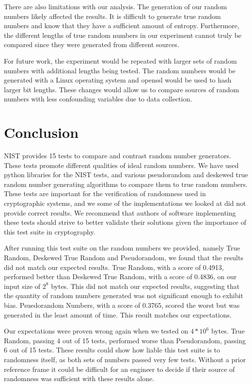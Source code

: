 \documentclass[11pt,letterpaper,conference]{IEEEtran}
\begin{document}
There are also limitations with our analysis. The generation of our random numbers likely affected the
results. It is difficult to generate true random numbers and know that they have a sufficient amount
of entropy. Furthermore, the different lengths of true random numbers in our experiment cannot truly
be compared since they were generated from different sources.

For future work, the experiment would be repeated with larger sets of random numbers with additional
lengths being tested. The random numbers would be generated with a Linux operating system and openssl
would be used to hash larger bit lengths. These changes would allow us to compare sources of random
numbers with less confounding variables due to data collection. 


\section{Conclusion}
NIST provides 15 tests to compare and contrast random number generators. These tests promote different
qualities of ideal random numbers. We have used python libraries for the NIST tests, and
various pseudorandom and deskewed true random number generating algorithms to compare them to true
random numbers. These tests are important for the verification of randomness used in cryptographic
systems, and we some of the implementations we looked at did not provide correct results. We recommend
that authors of software implementing these tests should strive to better validate their solutions
given the importance of this test suite in cryptography.

After running this test suite on the random numbers we provided, namely True Random, Deskewed True
Random and Pseudorandom, we found that the results did not match our expected results. True
Random, with a score of 0.4913, performed better than Deskewed True Random, with a score of
0.4836, on our input size of $2^8$ bytes. This did not match our expected results, suggesting that
the quantity of random numbers generated was not significant enough to exhibit bias. Psuedorandom Numbers, with a score of 0.3765,
scored the worst but was generated in the least amount of time. This result matches our expectations.

Our expectations were proven wrong again when we tested on $4*10^6$ bytes. True Random, passing 4
out of 15 tests, performed worse than Pseudorandom, passing 6 out of 15 tests. These results could
show how liable this test suite is to randomness itself, as both sets of numbers passed very few tests.
Without a prior reference frame it could be difficult for an engineer to decide if their source of
randomness was sufficient with these results alone.
\end{document}
